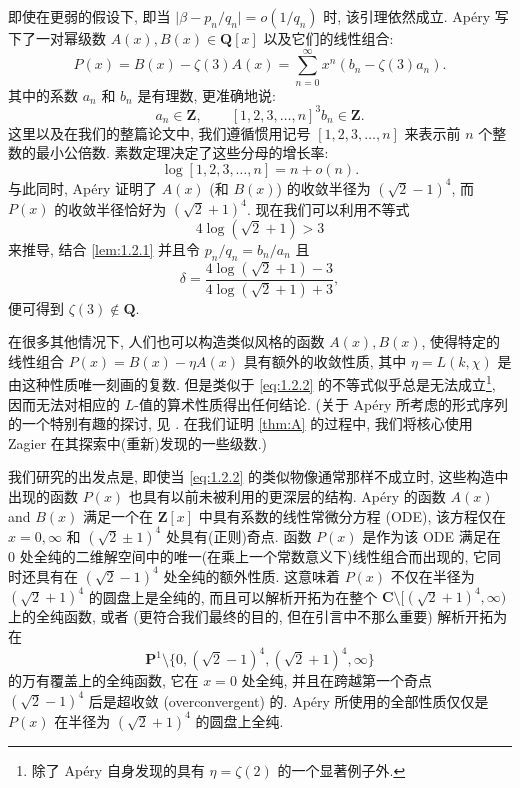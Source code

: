 即使在更弱的假设下, 即当 \(\lvert\beta - p_n/q_n\rvert = o(1/q_n)\) 时, 该引理依然成立.
Ap{\'e}ry 写下了一对幂级数 \(A(x), B(x) \in \mathbf{Q}[x]\) 以及它们的线性组合:
\begin{equation*}
  P(x) = B(x) - \zeta(3)A(x) = \sum_{n=0}^{\infty} x^n (b_{n} - \zeta(3)a_{n}).
\end{equation*}
其中的系数 \(a_n\) 和 \(b_n\) 是有理数, 更准确地说:
\begin{equation*}
  a_{n} \in \mathbf{Z}, \qquad {[1, 2, 3, \dots, n]}^3 b_{n} \in \mathbf{Z}.
\end{equation*}
这里以及在我们的整篇论文中, 我们遵循惯用记号 $[1, 2, 3, \dots, n]$ 来表示前 $n$ 个整数的最小公倍数.
素数定理决定了这些分母的增长率:
\[ \log[1, 2, 3, \dots, n] = n + o(n). \]
与此同时, Ap{\'e}ry 证明了 $A(x)$ (和 $B(x)$) 的收敛半径为 $(\sqrt{2}-1)^4$, 
而 $P(x)$ 的收敛半径恰好为 $(\sqrt{2}+1)^4$.
现在我们可以利用不等式
\begin{equation}\label{eq:1.2.2}
4\log(\sqrt{2}+1) > 3
\end{equation}
来推导, 结合 \autoref{lem:1.2.1} 并且令 $p_n/q_n = b_n/a_n$ 且
\[ \delta = \frac{4\log(\sqrt{2}+1) - 3}{4\log(\sqrt{2}+1) + 3}, \]
便可得到 $\zeta(3) \notin \mathbf{Q}$.

在很多其他情况下, 人们也可以构造类似风格的函数 $A(x), B(x)$, 使得特定的线性组合 $P(x) = B(x) - \eta A(x)$ 具有额外的收敛性质, 
其中 $\eta = L(k,\chi)$ 是由这种性质唯一刻画的复数.
但是类似于 \eqref{eq:1.2.2} 的不等式似乎总是无法成立\footnote{除了 Ap{\'e}ry 自身发现的具有 $\eta = \zeta(2)$ 的一个显著例子外.}, 
因而无法对相应的 $L$-值的算术性质得出任何结论.
(关于 Ap{\'e}ry 所考虑的形式序列的一个特别有趣的探讨, 见 \cite{Zag09}.
在我们证明 \autoref{thm:A} 的过程中, 我们将核心使用 Zagier 在其探索中(重新)发现的一些级数.)

我们研究的出发点是, 即使当 \eqref{eq:1.2.2} 的类似物像通常那样不成立时, 这些构造中出现的函数 $P(x)$ 也具有以前未被利用的更深层的结构.
Ap{\'e}ry 的函数 $A(x)$ and $B(x)$ 满足一个在 $\mathbf{Z}[x]$ 中具有系数的线性常微分方程 (ODE),
该方程仅在 $x=0, \infty$ 和 $(\sqrt{2}\pm 1)^4$ 处具有(正则)奇点.
函数 $P(x)$ 是作为该 ODE 满足在 $0$ 处全纯的二维解空间中的唯一(在乘上一个常数意义下)线性组合而出现的,
它同时还具有在 $(\sqrt{2}-1)^4$ 处全纯的额外性质.
这意味着 $P(x)$ 不仅在半径为 $(\sqrt{2}+1)^4$ 的圆盘上是全纯的, 
而且可以解析开拓为在整个 $\mathbf{C} \setminus [(\sqrt{2}+1)^4, \infty)$ 上的全纯函数,
或者 (更符合我们最终的目的, 但在引言中不那么重要) 解析开拓为在
\[ \mathbf{P}^1 \setminus \{0, (\sqrt{2}-1)^4, (\sqrt{2}+1)^4, \infty\} \]
的万有覆盖上的全纯函数, 它在 $x = 0$ 处全纯, 并且在跨越第一个奇点 $(\sqrt{2} - 1)^4$ 后是超收敛 (overconvergent) 的.
Ap{\'e}ry 所使用的全部性质仅仅是 $P(x)$ 在半径为 $(\sqrt{2} + 1)^4$ 的圆盘上全纯.

